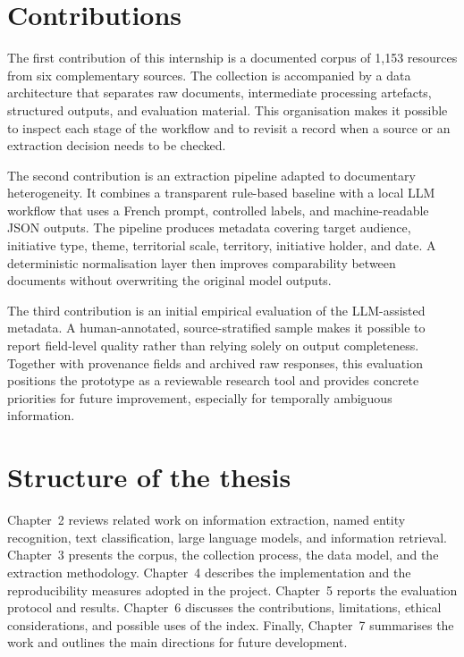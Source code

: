 \section{Contributions}

The first contribution of this internship is a documented corpus of 1,153
resources from six complementary sources. The collection is accompanied by a data
architecture that separates raw documents, intermediate processing artefacts,
structured outputs, and evaluation material. This organisation makes it possible
to inspect each stage of the workflow and to revisit a record when a source or an
extraction decision needs to be checked.

The second contribution is an extraction pipeline adapted to documentary
heterogeneity. It combines a transparent rule-based baseline with a local LLM
workflow that uses a French prompt, controlled labels, and machine-readable JSON
outputs. The pipeline produces metadata covering target audience, initiative type,
theme, territorial scale, territory, initiative holder, and date. A deterministic
normalisation layer then improves comparability between documents without
overwriting the original model outputs.

The third contribution is an initial empirical evaluation of the LLM-assisted
metadata. A human-annotated, source-stratified sample makes it possible to report
field-level quality rather than relying solely on output completeness. Together
with provenance fields and archived raw responses, this evaluation positions the
prototype as a reviewable research tool and provides concrete priorities for
future improvement, especially for temporally ambiguous information.

\section{Structure of the thesis}

Chapter~2 reviews related work on information extraction, named entity
recognition, text classification, large language models, and information
retrieval. Chapter~3 presents the corpus, the collection process, the data model,
and the extraction methodology. Chapter~4 describes the implementation and the
reproducibility measures adopted in the project. Chapter~5 reports the evaluation
protocol and results. Chapter~6 discusses the contributions, limitations, ethical
considerations, and possible uses of the index. Finally, Chapter~7 summarises the
work and outlines the main directions for future development.
